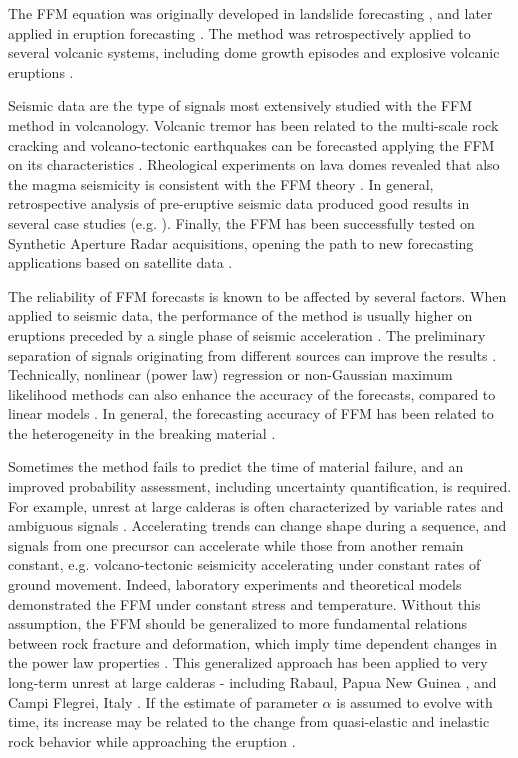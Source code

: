 \documentclass{article}
\begin{document}
The FFM equation was originally developed in landslide forecasting \citep{Fukuzuno1985, Voight1987, Voight1988b, Voight1989b}, and later applied in eruption forecasting \citep{Voight1988, Voight1989, Cornelius1995}. The method was retrospectively applied to several volcanic systems, including dome growth episodes and explosive volcanic eruptions \citep{Voight1991, Cornelius1994, Cornelius1996, Voight2000}.

Seismic data are the type of signals most extensively studied with the FFM method in volcanology. Volcanic tremor has been related to the multi-scale rock cracking \citep{Kilburn1998,Ortiz2003,Kilburn2003,Smith2009} and volcano-tectonic earthquakes can be forecasted applying the FFM on its characteristics \citep{Tarraga2006}. Rheological experiments on lava domes revealed that also the magma seismicity is consistent with the FFM theory \citep{Lavallee2008}. In general, retrospective analysis of pre-eruptive seismic data produced good results in several case studies (e.g. \cite{Smith2010, Budi2013, Chardot2013}). Finally, the FFM has been successfully tested on Synthetic Aperture Radar acquisitions, opening the path to new forecasting applications based on satellite data \citep{Moretto2016}.

The reliability of FFM forecasts is known to be affected by several factors. When applied to seismic data, the performance of the method is usually higher on eruptions preceded by a single phase of seismic acceleration \citep{Boue2015}. The preliminary separation of signals originating from different sources can improve the results \citep{Salvage2016, Salvage2017}. Technically, nonlinear (power law) regression or non-Gaussian maximum likelihood methods can also enhance the accuracy of the forecasts, compared to linear models \citep{Bell2011, Bell2013}. In general, the forecasting accuracy of FFM has been related to the heterogeneity in the breaking material \citep{Vasseur2015}. 

Sometimes the method fails to predict the time of material failure, and an improved probability assessment, including uncertainty quantification, is required. For example, unrest at large calderas is often characterized by variable rates and ambiguous signals \citep{Woo2010, Chiodini2016}. Accelerating trends can change shape during a sequence, and signals from one precursor can accelerate while those from another remain constant, e.g. volcano-tectonic seismicity accelerating under constant rates of ground movement. Indeed, laboratory experiments and theoretical models demonstrated the FFM under constant stress and temperature. Without this assumption, the FFM should be generalized to more fundamental relations between rock fracture and deformation, which imply time dependent changes in the power law properties \citep{Kilburn2012}. This generalized approach has been applied to very long-term unrest at large calderas - including Rabaul, Papua New Guinea \citep{Robertson2016}, and Campi Flegrei, Italy \citep{Kilburn2017}. If the estimate of parameter $\alpha$ is assumed to evolve with time, its increase may be related to the change from quasi-elastic and inelastic rock behavior while approaching the eruption \citep{Kilburn2018}.
\end{document}
